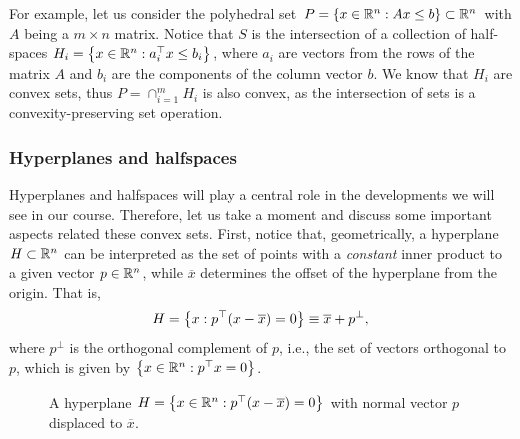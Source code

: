 For example, let us consider the polyhedral set $P = \left\{ x \in \mathbb{R}^n : Ax \leq b \right \} \subset \mathbb{R}^n$ with $A$ being a $m \times n$ matrix. Notice that $S$ is the intersection of a collection of half-spaces $H_i = \left\{ x \in \mathbb{R}^n : a_i^\top x \leq b_i \right \}$, where $a_i$ are vectors from the rows of the matrix $A$ and $b_i$ are the components of the column vector $b$. We know that $H_i$ are convex sets, thus $P = \cap_{i=1}^m H_i$ is also convex, as the intersection of sets is a convexity-preserving set operation.


\subsubsection{Hyperplanes and halfspaces}

Hyperplanes and halfspaces will play a central role in the developments we will see in our course. Therefore, let us take a moment and discuss some important aspects related these convex sets. First, notice that, geometrically, a hyperplane $H \subset \mathbb{R}^n$ can be interpreted as the set of points with a \emph{constant} inner product to a given vector $p \in \mathbb{R}^n$, while $\overline{x}$ determines the offset of the hyperplane from the origin. That is,
	\begin{equation*}
		H = \left\{ x : p^\top(x - \overline{x}) = 0 \right \} \equiv \overline{x} + p^{\perp},
	\end{equation*}
	where $p^\perp$ is the orthogonal complement of $p$, i.e., the set of vectors orthogonal to $p$, which is given by $\left\{ x \in \mathbb{R}^n : p^\top x = 0 \right \}$.
	
	\begin{figure}[H]
		\caption{A hyperplane $H = \left\{ x \in \mathbb{R}^n: p^\top(x - \overline{x}) = 0 \right \}$ with normal vector $p$ displaced to $\overline{x}$.}
	\end{figure}
	
